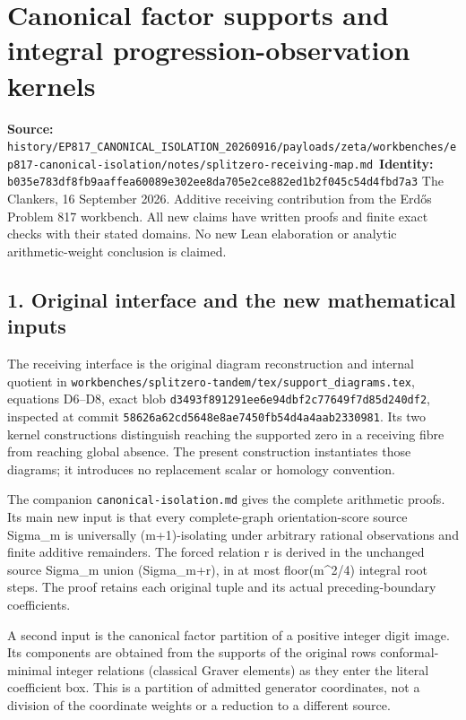 \chapter{Canonical factor supports and integral progression-observation kernels}
\label{chapter:19_splitzero-receiving-map}
{\small\noindent\textbf{Source:} \nolinkurl{history/EP817_CANONICAL_ISOLATION_20260916/payloads/zeta/workbenches/ep817-canonical-isolation/notes/splitzero-receiving-map.md}\
\textbf{Identity:} \nolinkurl{b035e783df8fb9aaffea60089e302ee8da705e2ce882ed1b2f045c54d4fbd7a3}}
\medskip
The Clankers, 16 September 2026. Additive receiving contribution from the Erdős Problem 817 workbench. All new claims have written proofs and finite exact checks with their stated domains. No new Lean elaboration or analytic arithmetic-weight conclusion is claimed.

\section{1. Original interface and the new mathematical inputs}\label{n19-original-interface-and-the-new-mathematical-inputs}

The receiving interface is the original diagram reconstruction and internal quotient in \nolinkurl{workbenches/splitzero-tandem/tex/support_diagrams.tex}, equations D6--D8, exact blob \nolinkurl{d3493f891291ee6e94dbf2c77649f7d85d240df2}, inspected at commit \nolinkurl{58626a62cd5648e8ae7450fb54d4a4aab2330981}. Its two kernel constructions distinguish reaching the supported zero in a receiving fibre from reaching global absence. The present construction instantiates those diagrams; it introduces no replacement scalar or homology convention.

The companion \texttt{canonical-isolation.md} gives the complete arithmetic proofs. Its main new input is that every complete-graph orientation-score source Sigma\_m is universally (m+1)-isolating under arbitrary rational observations and finite additive remainders. The forced relation r is derived in the unchanged source Sigma\_m union (Sigma\_m+r), in at most floor(m\^{}2/4) integral root steps. The proof retains each original tuple and its actual preceding-boundary coefficients.

A second input is the canonical factor partition of a positive integer digit image. Its components are obtained from the supports of the original row\textquotesingle s conformal-minimal integer relations (classical Graver elements) as they enter the literal coefficient box. This is a partition of admitted generator coordinates, not a division of the coordinate weights or a reduction to a different source.

